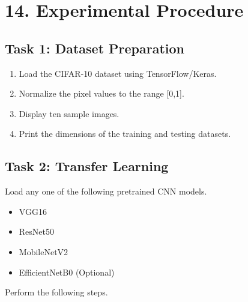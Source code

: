 \documentclass[11pt]{article}
\begin{document}

\section*{14. Experimental Procedure}

\subsection*{Task 1: Dataset Preparation}

\begin{enumerate}

\item Load the CIFAR-10 dataset using TensorFlow/Keras.

\item Normalize the pixel values to the range [0,1].

\item Display ten sample images.

\item Print the dimensions of the training and testing datasets.

\end{enumerate}


\subsection*{Task 2: Transfer Learning}

Load any one of the following pretrained CNN models.

\begin{itemize}

\item VGG16

\item ResNet50

\item MobileNetV2

\item EfficientNetB0 (Optional)

\end{itemize}

Perform the following steps.
\end{document}
